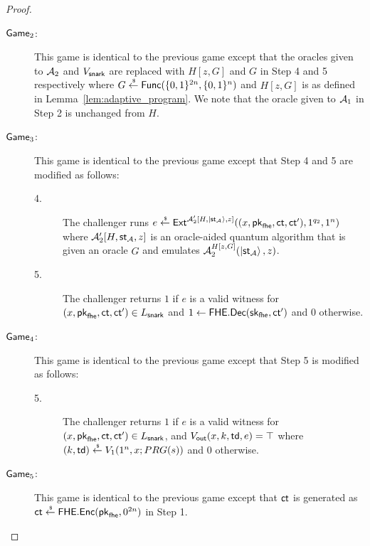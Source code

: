 \begin{proof}
\begin{description}
\item[$\mathsf{Game}_2$:]
This game is identical to the previous game except that the oracles given to $\mathcal{A}_2$ and $V_{\mathsf{snark}}$ are replaced with $H[z,G]$ and $G$ in Step 4 and 5 respectively where $G\overset{\hspace{0.1em}\mathsf{\scriptscriptstyle\$}}{\leftarrow} \mathsf{Func}(\{0,1\}^{2n},\{0,1\}^{n})$ and $H[z,G]$ is as defined in Lemma~\ref{lem:adaptive_program}. 
We note that the oracle given to $\mathcal{A}_1$ in Step 2 is unchanged from $H$.

\item[$\mathsf{Game}_3$:]
This game is identical to the previous game except that Step 4 and 5 are modified as follows:
\begin{description}
\item[4.] The challenger runs $e \overset{\hspace{0.1em}\mathsf{\scriptscriptstyle\$}}{\leftarrow} \mathsf{Ext}^{\mathcal{A}'_2[H,\ket{\mathsf{st}_{\mathcal{A}}},z]}((x,\mathsf{pk}_{\mathsf{fhe}},\mathsf{ct},\mathsf{ct}'),1^{q_2},1^n)$ where $\mathcal{A}'_2[H,\mathsf{st}_{\mathcal{A}},z]$ is an oracle-aided quantum algorithm that is given an oracle $G$ and emulates $\mathcal{A}_2^{H[z,G]}(\ket{\mathsf{st}_{\mathcal{A}}},z)$.
\item[5.] The challenger returns $1$ if 
$e$ is a valid witness for $(x,\mathsf{pk}_{\mathsf{fhe}},\mathsf{ct},\mathsf{ct}')\in L_{\mathsf{snark}}$ and $1 \leftarrow \mathsf{FHE}.\mathsf{Dec}(\mathsf{sk}_{\mathsf{fhe}},\mathsf{ct}')$ and $0$ otherwise.
\end{description}


\item[$\mathsf{Game}_4$:]
This game is identical to the previous game except that Step 5 is modified as follows:
\begin{description}
\item[5.] The challenger returns $1$ if 
$e$ is a valid witness for $(x,\mathsf{pk}_{\mathsf{fhe}},\mathsf{ct},\mathsf{ct}')\in L_{\mathsf{snark}}$, and $V_{\mathsf{out}}(x,k,\mathsf{td},e)=\top$ where $(k,\mathsf{td})\overset{\hspace{0.1em}\mathsf{\scriptscriptstyle\$}}{\leftarrow} V_1(1^n,x;PRG(s))$ and $0$ otherwise.
\end{description}

\item[$\mathsf{Game}_5$:]
This game is identical to the previous game except that $\mathsf{ct}$ is generated as $\mathsf{ct}\overset{\hspace{0.1em}\mathsf{\scriptscriptstyle\$}}{\leftarrow} \mathsf{FHE}.\mathsf{Enc}(\mathsf{pk}_{\mathsf{fhe}},\allowbreak 0^{2n})$ in Step 1.


\end{description}
\end{proof}
